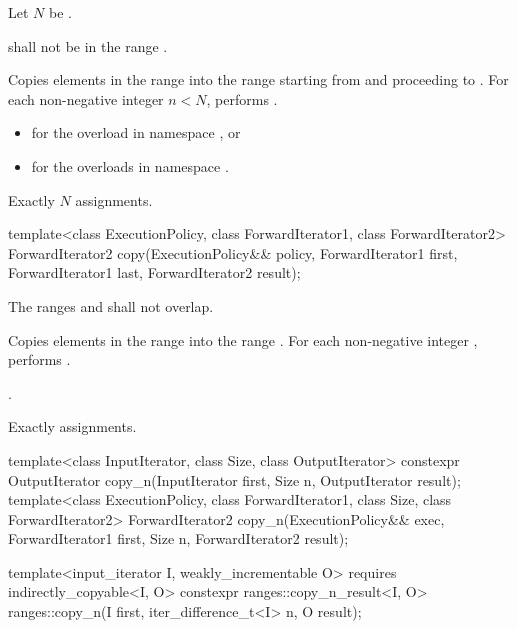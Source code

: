 \begin{itemdescr}
\pnum
Let $N$ be .

\pnum
\requires
{} shall not be in the range .

\pnum
\effects
Copies elements in the range 
into the range 
starting from  and proceeding to .
For each non-negative integer $n < N$,
performs .

\pnum
\returns
\begin{itemize}
\item
   for the overload in namespace , or
\item
   for the overloads in namespace .
\end{itemize}

\pnum
\complexity
Exactly $N$ assignments.
\end{itemdescr}

%
\begin{itemdecl}
template<class ExecutionPolicy, class ForwardIterator1, class ForwardIterator2>
  ForwardIterator2 copy(ExecutionPolicy&& policy,
                        ForwardIterator1 first, ForwardIterator1 last,
                        ForwardIterator2 result);
\end{itemdecl}

\begin{itemdescr}
\pnum
\requires
The ranges  and 
shall not overlap.

\pnum
\effects
Copies elements in the range 
into the range .
For each non-negative integer ,
performs .

\pnum
\returns
{}.

\pnum
\complexity
Exactly  assignments.
\end{itemdescr}

%
\begin{itemdecl}
template<class InputIterator, class Size, class OutputIterator>
  constexpr OutputIterator copy_n(InputIterator first, Size n,
                                  OutputIterator result);
template<class ExecutionPolicy, class ForwardIterator1, class Size, class ForwardIterator2>
  ForwardIterator2 copy_n(ExecutionPolicy&& exec,
                          ForwardIterator1 first, Size n,
                          ForwardIterator2 result);

template<input_iterator I, weakly_incrementable O>
  requires indirectly_copyable<I, O>
  constexpr ranges::copy_n_result<I, O>
    ranges::copy_n(I first, iter_difference_t<I> n, O result);
\end{itemdecl}

